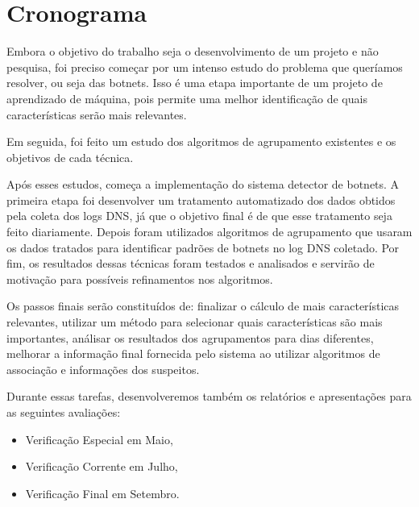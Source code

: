 \chapter{Cronograma}
Embora o objetivo do trabalho seja o desenvolvimento de um projeto e não pesquisa, foi preciso começar por um intenso estudo do problema que queríamos resolver, ou seja das botnets. Isso é uma etapa importante de um projeto de aprendizado de máquina, pois permite uma melhor identificação de quais características serão mais relevantes.

Em seguida, foi feito um estudo dos algoritmos de agrupamento existentes e os objetivos de cada técnica.

Após esses estudos, começa a implementação do sistema detector de botnets. A primeira etapa foi desenvolver um tratamento automatizado dos dados obtidos pela coleta dos logs DNS, já que o objetivo final é de que esse tratamento seja feito diariamente. Depois foram utilizados algoritmos de agrupamento que usaram os dados tratados para identificar padrões de botnets no log DNS coletado. Por fim, os resultados dessas técnicas foram testados e analisados e servirão de motivação para possíveis refinamentos nos algoritmos.

Os passos finais serão constituídos de: finalizar o cálculo de mais características relevantes, utilizar um método para selecionar quais características são mais importantes, análisar os resultados dos agrupamentos para dias diferentes, melhorar a informação final fornecida pelo sistema ao utilizar algoritmos de associação e informações dos suspeitos.

Durante essas tarefas, desenvolveremos também os relatórios e apresentações para as seguintes avaliações:

\begin{itemize}  
\item Verificação Especial em Maio,
\item Verificação Corrente em Julho,
\item Verificação Final em Setembro.
\end{itemize}

